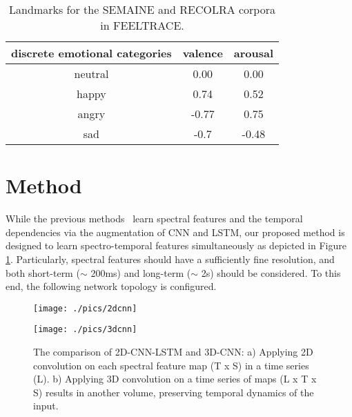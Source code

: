 \documentclass[conference, compsoc, twoside]{IEEEtran}
\begin{document}
\begin{table}[!t]

\centering
\vspace{10px}
\begin{tabular}{ccc}
\hline
discrete emotional categories   & valence & arousal\\
\hline
neutral   & 0.00 & 0.00 \\
happy   & 0.74  & 0.52\\
angry   & -0.77 & 0.75\\
sad     & -0.7  & -0.48\\
\hline
\end{tabular}
\vspace{0.15cm}
\caption{Landmarks for the SEMAINE and RECOLRA corpora in FEELTRACE.}\label{tab:feeltrace}
\end{table}

\section{Method}\label{sec:method}

While the previous methods~\cite{anandconvoluted,sainath2015convolutional} learn spectral features and the temporal dependencies via the augmentation of CNN and LSTM, our proposed method is designed to learn spectro-temporal features simultaneously as depicted in Figure \ref{fig:cnn}. Particularly, spectral features should have a sufficiently fine resolution, and both short-term ($\sim$ 200ms) and long-term ($\sim$ 2s) should be considered. To this end, the following network topology is configured.

\begin{figure}[!tb]
\begin{minipage}[b]{0.48\linewidth}
  \centerline{\texttt{[image: ./pics/2dcnn]}}
\end{minipage}
\begin{minipage}[b]{0.48\linewidth}
  \centerline{\texttt{[image: ./pics/3dcnn]}}
\end{minipage}
\vspace{0.15cm}
\caption{The comparison of 2D-CNN-LSTM and 3D-CNN: a) Applying 2D convolution on each spectral feature map (T x S) in a time series (L). b) Applying 3D convolution on a time series of maps (L x T x S) results in another volume, preserving temporal dynamics of the input.}
\label{fig:cnn}
\end{figure}
\end{document}
